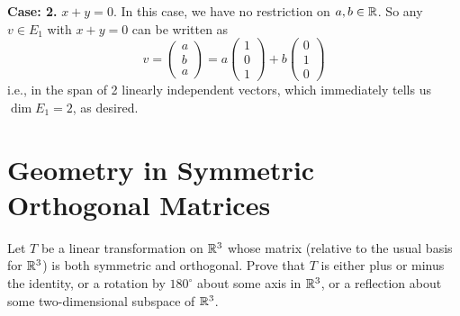 \documentclass[11pt, a4paper, abstract=true]{scrartcl}
\begin{document}
\begin{soln}
    \noindent\textbf{Case: 2.} \(x + y = 0\). In this case, we have no restriction on \(a, b \in \mathbb R\). So any \(v \in E_1\) with \(x + y = 0\) can be written as 
    \[
        v =
        \begin{pmatrix}
            a\\
            b\\
            a
        \end{pmatrix}
        = a
        \begin{pmatrix}
            1\\
            0\\
            1
        \end{pmatrix}
        + b
        \begin{pmatrix}
            0\\
            1\\
            0
        \end{pmatrix}
    \]
    i.e., in the span of 2 linearly independent vectors, which immediately tells us \(\dim E_1 = 2\), as desired.
\end{soln}

\newpage

\section{Geometry in Symmetric Orthogonal Matrices}

\begin{problem*}
    Let \(T\) be a linear transformation on \(\mathbb R^3\) whose matrix (relative to the usual basis for \(\mathbb R^3\)) is both symmetric and orthogonal. Prove that \(T\) is either plus or minus the identity, or a rotation by \(180^{\circ}\) about some axis in \(\mathbb R^3\), or a reflection about some two-dimensional subspace of \(\mathbb R^3\).
\end{problem*}
\end{document}
